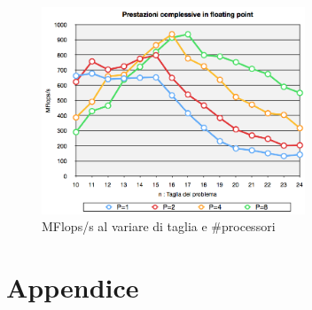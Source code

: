 \documentclass[12pt,a4paper,oneside,openright]{article}
\begin{document}
\begin{figure}[htp] 

  \centering
      \includegraphics[width=0.70\textwidth]{immagini/mflips}
  \caption{\small MFlops/s al variare di taglia e \#processori}
	 \label{mflips}
\end{figure}


\newpage
\appendix
\section{Appendice}
\end{document}
